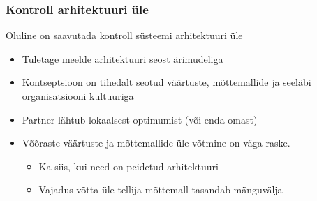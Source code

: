 \begin{frame}[fragile]
  \frametitle{Kontroll arhitektuuri üle}
  	Oluline on saavutada kontroll süsteemi arhitektuuri üle
	\begin{itemize}
		\item Tuletage meelde arhitektuuri seost ärimudeliga
		\item Kontseptsioon on tihedalt seotud väärtuste, mõttemallide ja seeläbi organisatsiooni kultuuriga
		\item Partner lähtub lokaalsest optimumist (või enda omast)
		\item Võõraste väärtuste ja mõttemallide üle võtmine on väga raske. 
		\begin{itemize}
			\item Ka siis, kui need on peidetud arhitektuuri
			\item Vajadus võtta üle tellija mõttemall tasandab mänguvälja
		\end{itemize}
	\end{itemize}
\end{frame}

